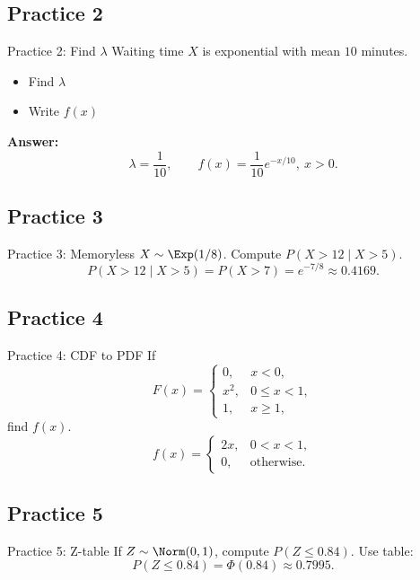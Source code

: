 \documentclass[aspectratio=169]{beamer}
\begin{document}
\subsection{Practice 2}
\begin{frame}{Practice 2: Find \(\lambda\)}
  Waiting time \(X\) is exponential with mean \(10\) minutes.
  \begin{itemize}
    \item Find \(\lambda\)
    \item Write \(f(x)\)
  \end{itemize}
  \pause
  \textbf{Answer:}
  \[
    \lambda=\frac{1}{10},\qquad
    f(x)=\frac{1}{10}e^{-x/10},\ x>0.
  \]
\end{frame}

\subsection{Practice 3}
\begin{frame}{Practice 3: Memoryless}
  \(X\sim\Exp(1/8)\). Compute \(P(X>12\mid X>5)\).
  \pause
  \[
    P(X>12\mid X>5)=P(X>7)=e^{-7/8}\approx 0.4169.
  \]
\end{frame}

\subsection{Practice 4}
\begin{frame}{Practice 4: CDF to PDF}
  If
  \[
    F(x)=
    \begin{cases}
      0, & x<0,\\
      x^2, & 0\le x<1,\\
      1, & x\ge 1,
    \end{cases}
  \]
  find \(f(x)\).
  \pause
  \[
    f(x)=
    \begin{cases}
      2x, & 0<x<1,\\
      0, & \text{otherwise}.
    \end{cases}
  \]
\end{frame}

\subsection{Practice 5}
\begin{frame}{Practice 5: Z-table}
  If \(Z\sim\Norm(0,1)\), compute \(P(Z\le 0.84)\).
  \pause
  Use table:
  \[
    P(Z\le 0.84)=\Phi(0.84)\approx 0.7995.
  \]
\end{frame}
\end{document}
